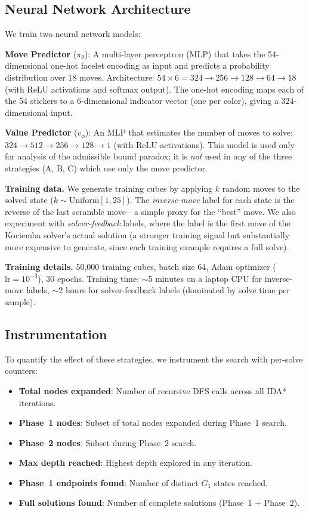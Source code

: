 \documentclass[10pt,twocolumn,a4paper]{article}
\begin{document}
\subsection{Neural Network Architecture}
\label{sec:neural-arch}

We train two neural network models:

\textbf{Move Predictor} ($\pi_\theta$): A multi-layer perceptron (MLP) that takes the 54-dimensional one-hot facelet encoding as input and predicts a probability distribution over 18 moves. Architecture: $54 \times 6 = 324 \to 256 \to 128 \to 64 \to 18$ (with ReLU activations and softmax output). The one-hot encoding maps each of the 54 stickers to a 6-dimensional indicator vector (one per color), giving a $324$-dimensional input.

\textbf{Value Predictor} ($v_\phi$): An MLP that estimates the number of moves to solve: $324 \to 512 \to 256 \to 128 \to 1$ (with ReLU activations). This model is used only for analysis of the admissible bound paradox; it is \emph{not} used in any of the three strategies (A, B, C) which use only the move predictor.

\textbf{Training data.} We generate training cubes by applying $k$ random moves to the solved state ($k \sim \text{Uniform}[1, 25]$). The \emph{inverse-move} label for each state is the reverse of the last scramble move---a simple proxy for the ``best'' move. We also experiment with \emph{solver-feedback} labels, where the label is the first move of the Kociemba solver's actual solution (a stronger training signal but substantially more expensive to generate, since each training example requires a full solve).

\textbf{Training details.} 50,000 training cubes, batch size 64, Adam optimizer ($\text{lr} = 10^{-3}$), 30 epochs. Training time: $\sim$5 minutes on a laptop CPU for inverse-move labels, $\sim$2 hours for solver-feedback labels (dominated by solve time per sample).

\subsection{Instrumentation}
\label{sec:instrumentation}

To quantify the effect of these strategies, we instrument the search with per-solve counters:
\begin{itemize}[leftmargin=*]
  \item \textbf{Total nodes expanded}: Number of recursive DFS calls across all IDA* iterations.
  \item \textbf{Phase~1 nodes}: Subset of total nodes expanded during Phase~1 search.
  \item \textbf{Phase~2 nodes}: Subset during Phase~2 search.
  \item \textbf{Max depth reached}: Highest depth explored in any iteration.
  \item \textbf{Phase~1 endpoints found}: Number of distinct $G_1$ states reached.
  \item \textbf{Full solutions found}: Number of complete solutions (Phase~1 + Phase~2).
\end{itemize}
\end{document}
